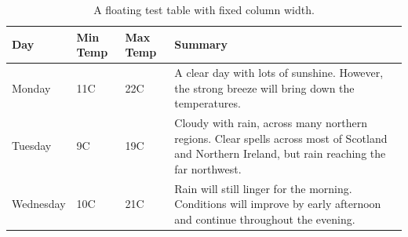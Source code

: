 \begin{table}[!ht]
  \centering
    \begin{tabular}{ | l | l | l | p{5cm} |}
    \hline
    Day & Min Temp & Max Temp & Summary \\ \hline
    Monday & 11C & 22C & A clear day with lots of sunshine.
    However, the strong breeze will bring down the temperatures. \\ \hline
    Tuesday & 9C & 19C & Cloudy with rain, across many northern regions. Clear spells
    across most of Scotland and Northern Ireland,
    but rain reaching the far northwest. \\ \hline
    Wednesday & 10C & 21C & Rain will still linger for the morning.
    Conditions will improve by early afternoon and continue
    throughout the evening. \\
    \hline
    \end{tabular}
  \caption{A floating test table with fixed column width.}
  \label{tab:testtab6}
\end{table}
